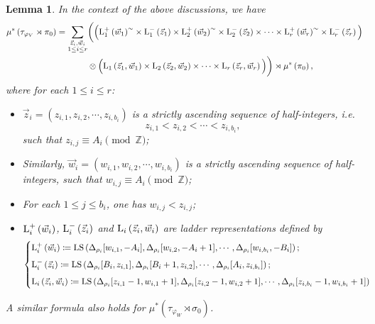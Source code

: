 \documentclass[11pt,letterpaper]{amsart}
\theoremstyle{plain}
\newcounter{theorem}[section]
\numberwithin{theorem}{section}
\numberwithin{equation}{subsection}
\newtheorem{Lem}[theorem]{Lemma}
\theoremstyle{remark}
\newcommand{\LS}{\operatorname{LS}} %
\newcommand{\Z}{\mathbb{Z}}
\begin{document}
\begin{Lem}\label{L:Co-multiofLadderClassical}
In the context of the above discussions, we have
\begin{align*}
    \mu^*\left(\tau_{\varphi_V}\rtimes\pi_0\right) = \sum_{\substack{\vec{z}_i,\vec{w}_i \\ 1\leq i\leq r}} &\bigg(\Big({\rm L}_1^+\left(\vec{w}_1\right)^\sim\times {\rm L}_1^-\left(\vec{z}_1\right)\times {\rm L}_2^+\left(\vec{w}_2\right)^\sim\times {\rm L}_2^-\left(\vec{z}_2\right)\times \cdots \times {\rm L}_r^+\left(\vec{w}_r\right)^\sim\times {\rm L}_r^-\left(\vec{z}_r\right)\Big) \\
    &\otimes \Big({\rm L}_1\left(\vec{z}_1,\vec{w}_1\right)\times {\rm L}_2\left(\vec{z}_2,\vec{w}_2\right)\times\cdots\times{\rm L}_r\left(\vec{z}_r,\vec{w}_r\right)\Big)\bigg) \rtimes \mu^*\left(\pi_0\right),
\end{align*} 
where for each $1\leq i\leq r$:
\begin{itemize}
     \item $\vec{z}_i = \left(z_{i,1},z_{i,2},\cdots,z_{i,b_i}\right)$ is a strictly ascending sequence of half-integers, i.e.
     \[
        z_{i,1}<z_{i,2}<\cdots<z_{i,b_i},
     \]
     such that $z_{i,j}\equiv A_i \pmod \Z$;

     \vskip 5pt

     \item Similarly, $\vec{w}_i = \left(w_{i,1},w_{i,2},\cdots,w_{i,b_i}\right)$ is a strictly ascending sequence of half-integers, such that $w_{i,j}\equiv A_i \pmod \Z$;

     \vskip 5pt

     \item For each $1\leq j \leq b_i$, one has $w_{i,j}<z_{i,j}$;

     \vskip 5pt

     \item ${\rm L}_i^+\left(\vec{w}_i\right)$, ${\rm L}_i^-\left(\vec{z}_i\right)$ and ${\rm L}_i\left(\vec{z}_i, \vec{w}_i\right)$ are ladder representations defined by
     \[
        \begin{cases}
            {\rm L}_i^+\left(\vec{w}_i\right)\coloneqq \LS\left(\Delta_{\rho_i}[w_{i,1},-A_i], \Delta_{\rho_i}[w_{i,2},-A_i+1],\cdots, \Delta_{\rho_i}[w_{i,b_i},-B_i]\right);\\[5pt]

            {\rm L}_i^-\left(\vec{z}_i\right)\coloneqq \LS\left(\Delta_{\rho_i}[B_i,z_{i,1}], \Delta_{\rho_i}[B_i+1,z_{i,2}],\cdots, \Delta_{\rho_i}[A_i,z_{i,b_i}]\right);\\[5pt]

            {\rm L}_i\left(\vec{z}_i, \vec{w}_i\right) \coloneqq \LS\left(\Delta_{\rho_i}[z_{i,1}-1,w_{i,1}+1], \Delta_{\rho_i}[z_{i,2}-1,w_{i,2}+1],\cdots, \Delta_{\rho_i}[z_{i,b_i}-1,w_{i,b_i}+1]\right)
        \end{cases}
     \]
 \end{itemize}
\vskip 5pt
A similar formula also holds for $\mu^*\left(\tau_{\varphi_W}\rtimes \sigma_0\right)$.
\end{Lem}\fi%
\end{document}
